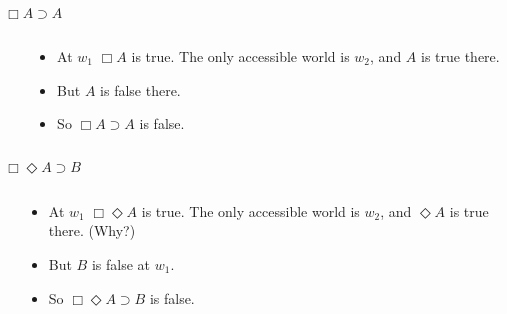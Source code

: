\documentclass[
  14pt,
  letterpaper,
  ignorenonframetext,
  aspectratio=169,
  handout]{beamer}
\begin{document}
\begin{frame}{\(\Box A \supset A\)}
\protect\hypertarget{box-a-supset-a}{}
\begin{columns}
    \begin{column}{0.45\textwidth}
    \end{column}
    \begin{column}{0.5\textwidth}
    \begin{itemize}
    \item At $w_1$ $\Box A$ is true. The only accessible world is $w_2$, and $A$ is true there.
    \item But $A$ is false there.
    \item So $\Box A \supset A$ is false.
    \end{itemize}
  \end{column}
\end{columns}
\end{frame}

\begin{frame}{\(\Box \Diamond A \supset B\)}
\protect\hypertarget{box-diamond-a-supset-b}{}
\begin{columns}
    \begin{column}{0.45\textwidth}
    \end{column}
    \begin{column}{0.5\textwidth}
    \begin{itemize}
    \item At $w_1$ $\Box \Diamond A$ is true. The only accessible world is $w_2$, and $\Diamond A$ is true there. (Why?)
    \item But $B$ is false at $w_1$.
    \item So $\Box \Diamond A \supset B$ is false.
    \end{itemize}
  \end{column}
\end{columns}
\end{frame}
\end{document}
